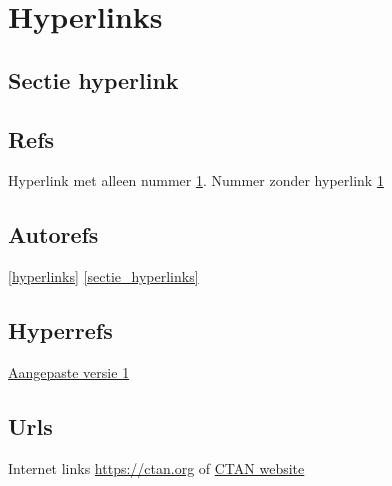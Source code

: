 \chapter{Hyperlinks}
\label{hyperlinks}

\blindtext[7]

\label{page_hyperlinks}

\section{Sectie hyperlink}
\label{sectie_hyperlinks}

\blindtext[7]

\section{Refs}

Hyperlink met alleen nummer \ref{hyperlinks}.  
Nummer zonder hyperlink \ref*{hyperlinks}

\section{Autorefs}

\autoref{hyperlinks}
\autoref{sectie_hyperlinks}

\section{Hyperrefs}

\hyperref[hyperlinks]{Aangepaste versie \ref*{hyperlinks}}

\section{Urls}

Internet links \url{https://ctan.org}
of \href{https://ctan.org}{CTAN website}